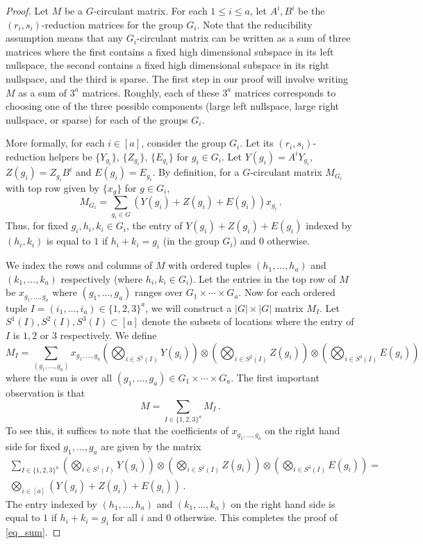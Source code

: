 \documentclass{toc}
\begin{document}
\begin{proof}
Let $M$ be a $G$-circulant matrix.  For each $1 \leq i \leq a$, let $A^i,B^i$ be the $(r_i,s_i)$-reduction matrices for the group $G_i$.  Note that the reducibility assumption means that any $G_i$-circulant matrix can be written as a sum of three matrices where the first contains a fixed high dimensional subspace in its left nullspace, the second contains a fixed high dimensional subspace in its right nullspace, and the third is sparse.  The first step in our proof will involve writing $M$ as a sum of $3^a$ matrices.  Roughly, each of these $3^a$ matrices corresponds to choosing one of the three possible components (large left nullspace, large right nullspace, or sparse) for each of the groups $G_i$.  

More formally, for each $i \in [a]$, consider the group $G_i$. Let its $(r_i,s_i)$-reduction helpers be $\{Y_{g_i} \}$, $\{Z_{g_i} \}$, $\{E_{g_i}\}$ for $g_i \in G_i$.   Let $Y(g_i) = A^{i}Y_{g_i}$, $Z(g_i) = Z_{g_i}B^i$ and  $E(g_i) = E_{g_i}$.  By definition, for a $G$-circulant matrix $M_{G_i}$ with top row given by $\{x_{g} \}$ for  $g \in G_i$,
\[
M_{G_i} = \sum_{g_i \in G} (Y(g_i) + Z(g_i) + E(g_i))x_{g_i} \,.
\]
Thus, for fixed $g_i, h_i,k_i \in G_i$, the entry of $Y( g_i) + Z( g_i) + E(g_i)$ indexed by $(h_i,k_i)$ is equal to  $1$ if $h_i + k_i = g_i$ (in the group $G_i$) and $0$ otherwise.

We index the rows and columns of $M$ with ordered tuples $(h_1, \dots , h_a)$ and $(k_1, \dots , k_a)$ respectively (where $h_i,k_i \in G_i$).  Let the entries in the top row of $M$ be $x_{g_1, \dots , g_a}$ where $(g_1, \dots , g_a)$ ranges over  $ G_1 \times \cdots \times G_a$. Now for each ordered tuple $I = (i_1, \dots ,i_a) \in \{1,2,3 \}^a$, we will construct a $|G| \times |G|$ matrix $M_I$.  Let $S^1(I), S^2(I), S^3(I) \subset [a]$ denote the subsets of locations where the entry of $I$ is $1,2$ or $3$ respectively.  We define
\[
M_I = \sum_{(g_1, \dots , g_a)} x_{g_1, \dots , g_a} \left(\bigotimes_{i \in S^1(I)}Y( g_i) \right) \otimes \left(\bigotimes_{i \in S^2(I)}Z( g_i)\right) \otimes \left(\bigotimes_{i \in S^3(I)}E(g_i) \right)
\] 
where the sum is over all $(g_1, \dots , g_a) \in  G_1 \times \cdots \times G_a$.  The first important observation is that 
\begin{equation}\label{eq_sum}
M =  \sum_{I \in \{1,2,3 \}^a} M_I \,.
\end{equation}
To see this, it suffices to note that the coefficients of $x_{g_1, \dots , g_a}$ on the right hand side for fixed $g_1, \dots , g_a$ are given by the matrix 
\begin{align*}
\sum_{I \in \{1,2,3 \}^a}  \left(\bigotimes_{i \in S^1(I)}Y( g_i) \right) \otimes \left(\bigotimes_{i \in S^2(I)}Z( g_i)\right) \otimes \left(\bigotimes_{i \in S^3(I)}E(g_i) \right) = \\
\bigotimes_{i \in [a]}\left(Y( g_i) + Z(g_i) + E(g_i) \right) \,.
\end{align*}
The entry indexed by $(h_1, \dots , h_a)$ and $(k_1, \dots , k_a)$ on the right hand side is equal to $1$ if $h_i + k_i = g_i$ for all $i$ and $0$ otherwise.  This completes the proof of \eqref{eq_sum}.


\end{proof}
\end{document}
